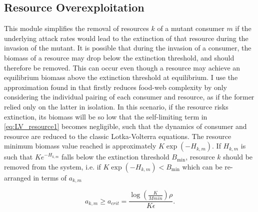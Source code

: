 \documentclass[a4paper]{report}
\DeclareMathOperator{\log}{log}
\begin{document}
\subsection{Resource Overexploitation}
\label{sec:res_over}
This module simplifies the removal of resources $k$ of a mutant consumer $m$ if the underlying attack rates would lead to the extinction of that resource during the invasion of the mutant. It is possible that during the invasion of a consumer, the biomass of a resource may drop below the extinction threshold, and should therefore be removed. This can occur even though a resource may achieve an equilibrium biomass above the extinction threshold at equilibrium. I use the approximation found in \citep{Rossberg2013} that firstly reduces food-web complexity by only considering the individual pairing of each consumer and resource, as if the former relied only on the latter in isolation. In this scenario, if the resource risks extinction, its biomass will be so low that the self-limiting term in \eqref{eq:LV_resource1} becomes negligible, such that the dynamics of consumer and resource are reduced to the classic Lotka-Volterra equations. The resource minimum biomass value reached is approximately $K \exp(-H_{k,m})$. If $H_{k,m}$ is such that $K e^{-H_{k,m}}$ falls below the extinction threshold $B_{\text{min}}$, resource $k$ should be removed from the system, i.e. if $K \exp(-H_{k,m})<B_{\text{min}}$ which can be re-arranged in terms of $a_{k,m}$

\begin{equation}
a_{k,m}\geq a_{crit}=\frac{\log(\frac{K}{Mmin})\rho}{K\epsilon}.\label{eq:over_exploitation}
\end{equation}
\end{document}
